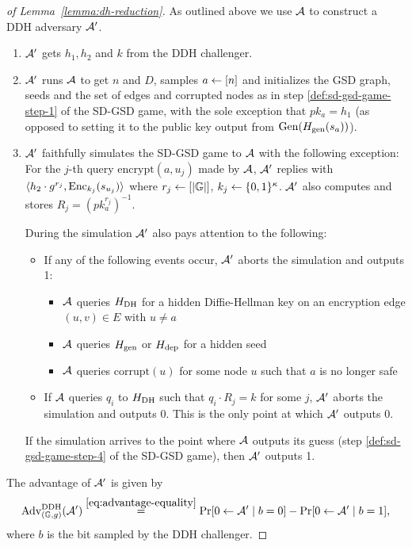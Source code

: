 \begin{proof}[of Lemma~\ref{lemma:dh-reduction}]
	As outlined above we use $\mathcal{A}$ to construct a DDH adversary $\mathcal{A}'$.
	\begin{enumerate}[1.]
		\item $\mathcal{A}'$ gets $h_1, h_2$ and $k$ from the DDH challenger.
		\item $\mathcal{A}'$ runs $\mathcal{A}$ to get $n$ and $D$, samples $a \leftarrow [n]$ and initializes the GSD graph, seeds and the set of edges and corrupted nodes as in step \ref{def:sd-gsd-game-step-1} of the SD-GSD game, with the sole exception that $pk_a = h_1$ (as opposed to setting it to the public key output from $\mathrm{Gen}(H_\mathrm{gen}(s_a))$).
		\item $\mathcal{A}'$ faithfully simulates the SD-GSD game to $\mathcal{A}$ with the following exception: For the $j$-th query $\mathrm{encrypt}(a, u_j)$ made by $\mathcal{A}$, $\mathcal{A}'$ replies with $\langle h_2 \cdot g^{r_j}, \mathrm{Enc}_{k_j}(s_{u_j}) \rangle$ where $r_j \leftarrow [\lvert\mathbb{G}\rvert]$, $k_j \leftarrow \{0, 1\}^\kappa$. $\mathcal{A}'$ also computes and stores $R_j = \left(pk_a^{r_j}\right)^{-1}$.

		      During the simulation $\mathcal{A}'$ also pays attention to the following:
		      \begin{itemize}
			      \item If any of the following events occur, $\mathcal{A}'$ aborts the simulation and outputs 1:
			            \begin{itemize}
				            \item $\mathcal{A}$ queries $H_\mathrm{DH}$ for a hidden Diffie-Hellman key on an encryption edge $(u, v) \in E$ with $u \neq a$
				            \item $\mathcal{A}$ queries $H_\mathrm{gen}$ or $H_\mathrm{dep}$ for a hidden seed
				            \item $\mathcal{A}$ queries $\mathrm{corrupt}(u)$ for some node $u$ such that $a$ is no longer safe
			            \end{itemize}
			      \item If $\mathcal{A}$ queries $q_i$ to $H_\mathrm{DH}$ such that $q_i \cdot R_j = k$ for some $j$, $\mathcal{A}'$ aborts the simulation and outputs 0. This is the only point at which $\mathcal{A}'$ outputs 0.
		      \end{itemize}

		      If the simulation arrives to the point where $\mathcal{A}$ outputs its guess (step \ref{def:sd-gsd-game-step-4} of the SD-GSD game), then $\mathcal{A}'$ outputs 1.
	\end{enumerate}

	The advantage of $\mathcal{A}'$ is given by
	\begin{equation} \label{eq:lemma-dh-reduction-advantage}
		\mathrm{Adv}_{(\mathbb{G}, g)}^{\mathrm{DDH}}(\adv') \stackrel{\eqref{eq:advantage-equality}}{=} \pr{0 \from \adv' \mid b = 0} - \pr{0 \from \adv' \mid b = 1},
	\end{equation}
	where $b$ is the bit sampled by the DDH challenger.


\end{proof}
